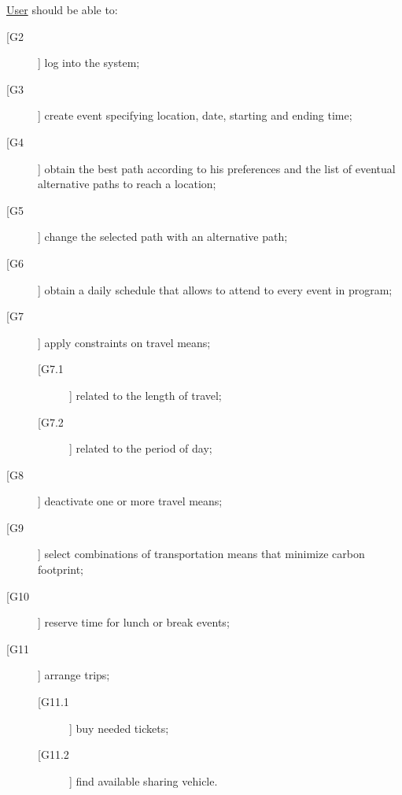 \noindent\underline{User} should be able to:
\begin{description}
\item[[G2]] log into the system;
\item[[G3]] create event specifying location, date, starting and ending time;
\item[[G4]] obtain the best path according to his preferences and the list of eventual alternative paths to reach a location;
\item[[G5]] change the selected path with an alternative path; 
\item[[G6]] obtain a daily schedule that allows to attend to every event in program;
\item[[G7]] apply constraints on travel means;
	\begin{description}
	\item[[G7.1]] related to the length of travel;
	\item[[G7.2]] related to the period of day;
	\end{description}
\item[[G8]] deactivate one or more travel means;
\item[[G9]] select combinations of transportation means that minimize carbon footprint;
\item[[G10]] reserve time for lunch or break events;
\item[[G11]] arrange trips;
	\begin{description}
	\item[[G11.1]] buy needed tickets;
	\item[[G11.2]] find available sharing vehicle.
	\end{description}
\end{description}
